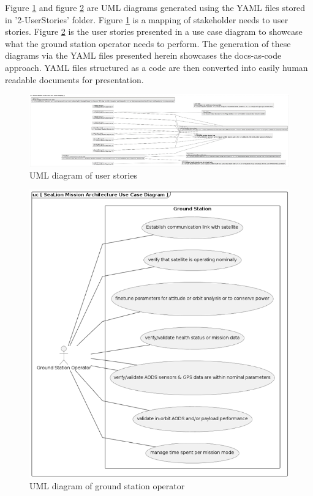 \documentclass[journal,article,submit,pdftex,moreauthors]{Definitions/mdpi}
\begin{document}
Figure \ref{fig:uml_userstory} and figure \ref{fig:uml_userstory2} are UML diagrams generated using the YAML files stored in '2-UserStories' folder.  Figure \ref{fig:uml_userstory} is a mapping of stakeholder needs to user stories.  Figure \ref{fig:uml_userstory2} is the user stories presented in a use case diagram to showcase what the ground station operator needs to perform.  The generation of these diagrams via the YAML files presented herein showcases the docs-as-code approach.  YAML files structured as a code are then converted into easily human readable documents for presentation.

\begin{figure}[H]
    \includegraphics[width=12 cm]{assets/uml_userstory.png}
    \caption{UML diagram of user stories}
	\label{fig:uml_userstory}
    \end{figure}   
\unskip

\begin{figure}[H]
    \includegraphics[width=12 cm]{assets/uml_userstory2.png}
    \caption{UML diagram of ground station operator}
	\label{fig:uml_userstory2}
    \end{figure}   
\unskip
\end{document}

